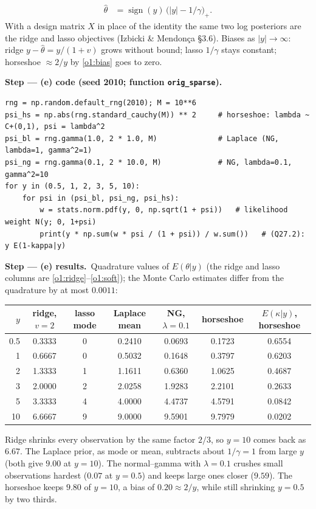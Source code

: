 \documentclass[11pt,a4paper]{article}
\newcommand{\passo}[2]{\par\smallskip\noindent\textbf{Step --- #1.}~#2}
\begin{document}
\begin{sol}
{\begin{align}
\hat\theta&=\operatorname{sign}(y)\,\big(|y|-1/\gamma\big)_+.\label{o1:soft}
\end{align}
With a design matrix $X$ in place of the identity the same two log posteriors are the ridge and lasso objectives (Izbicki \& Mendonça \S3.6). Biases as $|y|\to\infty$: ridge $y-\hat\theta=y/(1+v)$ grows without bound; lasso $1/\gamma$ stays constant; horseshoe $\approx2/y$ by \eqref{o1:bias} goes to zero.}
\passo{(e) code (seed 2010; function \texttt{orig\_sparse})}{}
\begin{lstlisting}
rng = np.random.default_rng(2010); M = 10**6
psi_hs = np.abs(rng.standard_cauchy(M)) ** 2     # horseshoe: lambda ~ C+(0,1), psi = lambda^2
psi_bl = rng.gamma(1.0, 2 * 1.0, M)              # Laplace (NG, lambda=1, gamma^2=1)
psi_ng = rng.gamma(0.1, 2 * 10.0, M)             # NG, lambda=0.1, gamma^2=10
for y in (0.5, 1, 2, 3, 5, 10):
    for psi in (psi_bl, psi_ng, psi_hs):
        w = stats.norm.pdf(y, 0, np.sqrt(1 + psi))   # likelihood weight N(y; 0, 1+psi)
        print(y * np.sum(w * psi / (1 + psi)) / w.sum())   # (Q27.2): y E(1-kappa|y)
\end{lstlisting}
\passo{(e) results}{Quadrature values of $E(\theta|y)$ (the ridge and lasso columns are \eqref{o1:ridge}--\eqref{o1:soft}); the Monte Carlo estimates differ from the quadrature by at most $0.0011$:
\begin{center}\small
\begin{tabular}{rcccccc}
\toprule
$y$ & ridge, $v=2$ & lasso mode & Laplace mean & NG, $\lambda=0.1$ & horseshoe & $E(\kappa|y)$, horseshoe\\
\midrule
0.5 & 0.3333 & 0 & 0.2410 & 0.0693 & 0.1723 & 0.6554\\
1 & 0.6667 & 0 & 0.5032 & 0.1648 & 0.3797 & 0.6203\\
2 & 1.3333 & 1 & 1.1611 & 0.6360 & 1.0625 & 0.4687\\
3 & 2.0000 & 2 & 2.0258 & 1.9283 & 2.2101 & 0.2633\\
5 & 3.3333 & 4 & 4.0000 & 4.4737 & 4.5791 & 0.0842\\
10 & 6.6667 & 9 & 9.0000 & 9.5901 & 9.7979 & 0.0202\\
\bottomrule
\end{tabular}
\end{center}
Ridge shrinks every observation by the same factor $2/3$, so $y=10$ comes back as $6.67$. The Laplace prior, as mode or mean, subtracts about $1/\gamma=1$ from large $y$ (both give $9.00$ at $y=10$). The normal--gamma with $\lambda=0.1$ crushes small observations hardest ($0.07$ at $y=0.5$) and keeps large ones closer ($9.59$). The horseshoe keeps $9.80$ of $y=10$, a bias of $0.20\approx2/y$, while still shrinking $y=0.5$ by two thirds.}

\end{sol}
\end{document}
